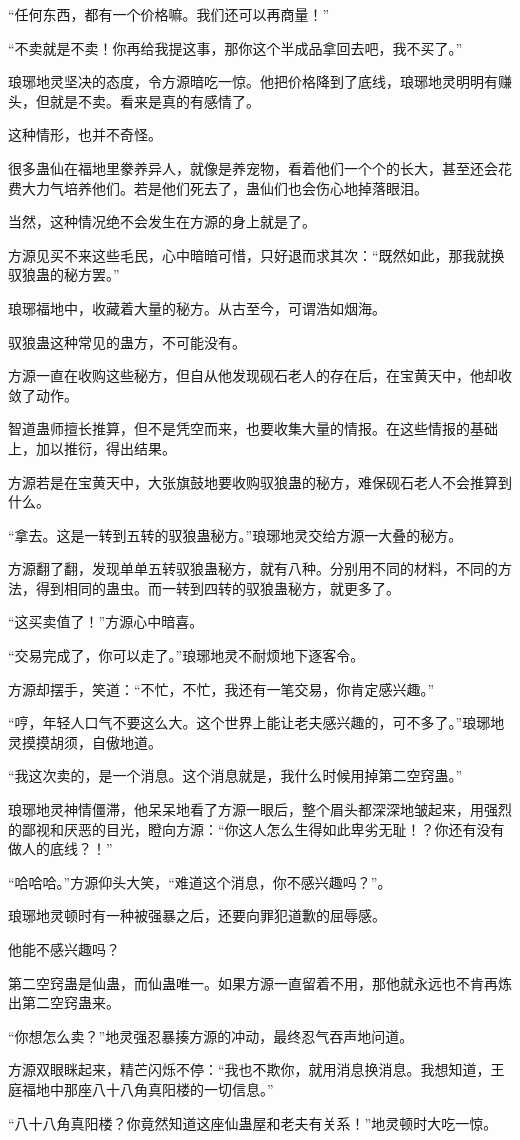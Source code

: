 \begin{this_body}
“任何东西，都有一个价格嘛。我们还可以再商量！”

“不卖就是不卖！你再给我提这事，那你这个半成品拿回去吧，我不买了。”

琅琊地灵坚决的态度，令方源暗吃一惊。他把价格降到了底线，琅琊地灵明明有赚头，但就是不卖。看来是真的有感情了。

这种情形，也并不奇怪。

很多蛊仙在福地里豢养异人，就像是养宠物，看着他们一个个的长大，甚至还会花费大力气培养他们。若是他们死去了，蛊仙们也会伤心地掉落眼泪。

当然，这种情况绝不会发生在方源的身上就是了。

方源见买不来这些毛民，心中暗暗可惜，只好退而求其次：“既然如此，那我就换驭狼蛊的秘方罢。”

琅琊福地中，收藏着大量的秘方。从古至今，可谓浩如烟海。

驭狼蛊这种常见的蛊方，不可能没有。

方源一直在收购这些秘方，但自从他发现砚石老人的存在后，在宝黄天中，他却收敛了动作。

智道蛊师擅长推算，但不是凭空而来，也要收集大量的情报。在这些情报的基础上，加以推衍，得出结果。

方源若是在宝黄天中，大张旗鼓地要收购驭狼蛊的秘方，难保砚石老人不会推算到什么。

“拿去。这是一转到五转的驭狼蛊秘方。”琅琊地灵交给方源一大叠的秘方。

方源翻了翻，发现单单五转驭狼蛊秘方，就有八种。分别用不同的材料，不同的方法，得到相同的蛊虫。而一转到四转的驭狼蛊秘方，就更多了。

“这买卖值了！”方源心中暗喜。

“交易完成了，你可以走了。”琅琊地灵不耐烦地下逐客令。

方源却摆手，笑道：“不忙，不忙，我还有一笔交易，你肯定感兴趣。”

“哼，年轻人口气不要这么大。这个世界上能让老夫感兴趣的，可不多了。”琅琊地灵摸摸胡须，自傲地道。

“我这次卖的，是一个消息。这个消息就是，我什么时候用掉第二空窍蛊。”

琅琊地灵神情僵滞，他呆呆地看了方源一眼后，整个眉头都深深地皱起来，用强烈的鄙视和厌恶的目光，瞪向方源：“你这人怎么生得如此卑劣无耻！？你还有没有做人的底线？！”

“哈哈哈。”方源仰头大笑，“难道这个消息，你不感兴趣吗？”。

琅琊地灵顿时有一种被强暴之后，还要向罪犯道歉的屈辱感。

他能不感兴趣吗？

第二空窍蛊是仙蛊，而仙蛊唯一。如果方源一直留着不用，那他就永远也不肯再炼出第二空窍蛊来。

“你想怎么卖？”地灵强忍暴揍方源的冲动，最终忍气吞声地问道。

方源双眼眯起来，精芒闪烁不停：“我也不欺你，就用消息换消息。我想知道，王庭福地中那座八十八角真阳楼的一切信息。”

“八十八角真阳楼？你竟然知道这座仙蛊屋和老夫有关系！”地灵顿时大吃一惊。

\end{this_body}

